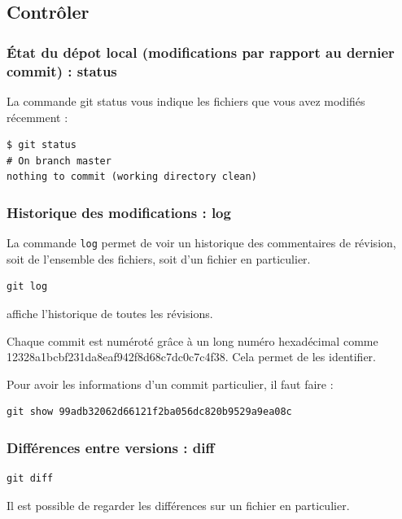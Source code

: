 \documentclass[a4paper,twoside]{article}
\begin{document}
\subsection{Contrôler}
\subsubsection{État du dépot local (modifications par rapport au dernier commit) : status}
La commande git status vous indique les fichiers que vous avez modifiés récemment :
\begin{verbatim}
$ git status
# On branch master
nothing to commit (working directory clean)
\end{verbatim}

\subsubsection{Historique des modifications : log}
La commande \texttt{log} permet de voir un historique des commentaires de révision, soit de l'ensemble des fichiers, soit d'un fichier en particulier.

\begin{verbatim}
git log
\end{verbatim}
affiche l'historique de toutes les révisions.

\begin{attention}
Chaque commit est numéroté grâce à un long numéro hexadécimal comme 12328a1bcbf231da\-8eaf942f8d68c7dc0c7c4f38. Cela permet de les identifier.
\end{attention}

Pour avoir les informations d'un commit particulier, il faut faire :
\begin{verbatim}
git show 99adb32062d66121f2ba056dc820b9529a9ea08c
\end{verbatim}

\subsubsection{Différences entre versions : diff}

\begin{verbatim}
git diff
\end{verbatim}

\begin{remarque}
Il est possible de regarder les différences sur un fichier en particulier.
\end{remarque}
\end{document}
